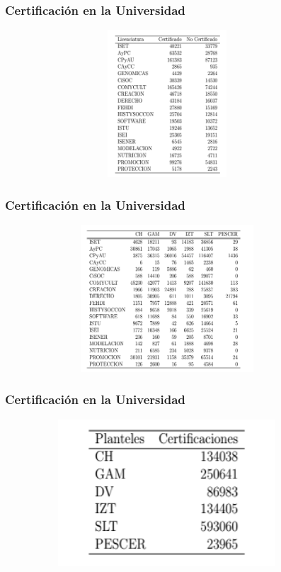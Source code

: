 \documentclass[xcolor=dvipsnames]{beamer}
\begin{document}
\begin{frame}\frametitle{Certificaci\'on en la Universidad}
\textbf{
}
\begin{figure}[H]
\centering
\includegraphics[width=10cm,height=5.5cm]{Tablas/CertificacionLicFnF.png}
\end{figure}
\end{frame}


\begin{frame}\frametitle{Certificaci\'on en la Universidad}
\textbf{
}
\begin{figure}[H]
\centering
\includegraphics[width=10cm,height=5.5cm]{Tablas/CertificacionLicPlanteles.png}
\end{figure}
\end{frame}

\begin{frame}\frametitle{Certificaci\'on en la Universidad}
\textbf{
}
\begin{figure}[H]
\centering
\includegraphics[width=10cm,height=5.5cm]{Tablas/CertificacionPlanteles.png}
\end{figure}
\end{frame}
\end{document}
